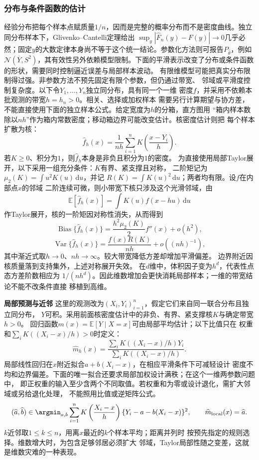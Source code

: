 \subsubsection{分布与条件函数的估计}
\label{sec:statistics-nonparametric-missing}
经验分布把每个样本点赋质量\(1/n\)，因而是完整的概率分布而不是密度曲线。独立同分布样本下，Glivenko--Cantelli定理给出
\(\sup_y|\widehat F_n(y)-F(y)|\to0\)几乎必然；固定\(y\)的大数定律本身尚不等于这个统一结论。参数化方法则可报告\(P_{\widehat\theta}\)，例如
\(\mathcal N(\overline Y,S^2)\)，其有效性另外依赖模型限制。下面的平滑表示改变了分布或条件函数的形状，需要同时控制逼近误差与局部样本波动。
有限维模型可能把真实分布限制得过强。非参数方法不预先固定有限个参数，但仍通过带宽、
邻域或平滑度控制复杂度。以下令\(Y_1,\ldots,Y_n\)独立同分布，具有同一个一维
密度\(f\)，并采用不依赖本批观测的带宽\(h=h_n>0\)。相关、选择或加权样本
需要另行计算期望与协方差，不能直接使用下面的独立样本公式。给定宽度为\(h\)的分箱，直方图用
“箱内样本数除以\(nh\)”作为箱内常数密度；移动箱边界可能改变估计。核密度估计则把
每个样本扩散为核：
\[
  \widehat f_h(x)
  =\frac1{nh}\sum_{i=1}^n
    K\left(\frac{x-Y_i}{h}\right).
\]
若\(K\geq0\)、积分为\(1\)，则\(\widehat f_h\)本身是非负且积分为\(1\)的密度。
为直接使用局部Taylor展开，以下采用一组充分条件：\(K\)有界、紧支撑且对称，
二阶矩记为\(\mu_2(K)=\int u^2K(u)\,\mathrm du\)，并记
\(R(K)=\int K(u)^2\,\mathrm du\)；两者均有限。设\(f\)在内部点\(x\)的邻域
二阶连续可微，则小带宽下核只涉及这个光滑邻域，由
\[
  \mathbb{E}[\widehat f_h(x)]
  =\int K(u)f(x-hu)\,\mathrm du
\]
作Taylor展开，核的一阶矩因对称性消失，从而得到
\[
  \operatorname{Bias}\{\widehat f_h(x)\}
  =\frac{h^2\mu_2(K)}2f''(x)+o(h^2),
\]
\[
  \operatorname{Var}\{\widehat f_h(x)\}
  =\frac{f(x)R(K)}{nh}+o((nh)^{-1}),
\]
其中渐近式取\(h\to0\)、\(nh\to\infty\)。较大带宽降低方差却增加平滑偏差。
边界附近因核质量落到支持集外，上述对称展开失效。
在\(d\)维中，体积因子变为\(h^d\)，代表性点态方差阶数相应为
\(1/(nh^d)\)。因此维数增加会更快消耗局部样本；一维的带宽结论不能不改条件直接
移植到高维。

\par\medskip\noindent\textbf{局部预测与近邻}\quad
这里的观测改为\((X_i,Y_i)_{i=1}^n\)，假定它们来自同一联合分布且独立同分布，
\(Y\)可积。采用前面核密度估计中的非负、有界、紧支撑核\(K\)与确定带宽\(h>0\)。
回归函数\(m(x)=\mathbb{E}[Y\mid X=x]\)可由局部平均估计；以下比值只在
权重和\(\sum_iK((X_i-x)/h)>0\)时定义：
\[
  \widehat m_h(x)=
  \frac{\sum_iK((X_i-x)/h)Y_i}
       {\sum_iK((X_i-x)/h)}.
\]
局部线性回归在\(x\)附近拟合\(a+b(X_i-x)\)，在相应平滑条件下可减轻设计
密度不均和边界偏差。下面的唯一拟合还要求局部加权设计满秩；在这个一维两参数问题中，
即正权重的输入至少含两个不同取值。若权重和为零或设计退化，需扩大邻域或另给退化处理，
不能照用比值或逆矩阵公式。
\[
  (\widehat a,\widehat b)
  \in\argmin_{a,b}\sum_{i=1}^n
  K\left(\frac{X_i-x}{h}\right)
  \{Y_i-a-b(X_i-x)\}^2,
  \qquad \widehat m_{\mathrm{local}}(x)=\widehat a.
\]
\(k\)近邻取\(1\leq k\leq n\)，用离\(x\)最近的\(k\)个样本平均；距离并列时
按预先指定的规则选择。维数增大时，为包含足够邻居必须扩大
邻域，Taylor局部性随之变差，这就是维数灾难的一种表现。

